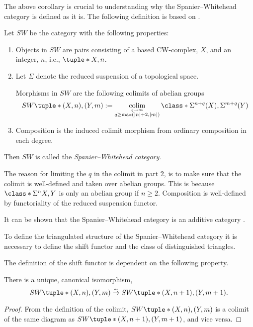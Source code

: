 The above corollary is crucial to understanding why the Spanier--Whitehead category is defined as it is. The following definition is based on \cite[Definition 2]{Schwede_2010}.

\begin{definition}
    \label{def:sw-cat}
    Let \( SW \) be the category with the following properties:
    \begin{enumerate}
        \item {
            Objects in \( SW \) are pairs consisting of a based CW-complex, \( X \), and an integer, \( n \), i.e., \( \tuple*{X, n} \).
        }
        \item {
            Let \( \Sigma \) denote the reduced suspension of a topological space.

            Morphisms in \( SW \) are the following colimits of abelian groups
            \[
                SW\tuple*{ (X, n), (Y, m) } := \colim_{\stackrel{q \to \infty}{q \geq \max(|n| + 2, |m|)}} \class*{ \Sigma^{n + q}(X), \Sigma^{m + q}(Y) }
            \]
        }
        \item {
            Composition is the induced colimit morphism from ordinary composition in each degree.
        }
    \end{enumerate}

    Then \( SW \) is called the \emph{Spanier--Whitehead category}.
\end{definition}

The reason for limiting the \( q \) in the colimit in part 2, is to make sure that the colimit is well-defined and taken over abelian groups. This is because \( \class*{\Sigma^n X, Y} \) is only an abelian group if \( n \geq 2 \). Composition is well-defined by functoriality of the reduced suspension functor.

It can be shown that the Spanier--Whitehead category is an additive category \cite[Proposition 5.7]{Daria_Bachelor}.

To define the triangulated structure of the Spanier--Whitehead category it is necessary to define the shift functor and the class of distinguished triangles.

The definition of the shift functor is dependent on the following property.
\begin{lemma}
    \label{lem:sw_colim_canonical_iso}
    There is a unique, canonical isomorphism,
    \[
        SW\tuple*{ (X, n), (Y, m) } \stackrel{\sim}{\to} SW\tuple*{ (X, n + 1), (Y, m + 1) }.
    \]
\end{lemma}
\begin{proof}
    From the definition of the colimit, \( SW\tuple*{ (X, n), (Y, m) } \) is a colimit of the same diagram as \( SW\tuple*{ (X, n + 1), (Y, m + 1) } \), and vice versa.
\end{proof}


